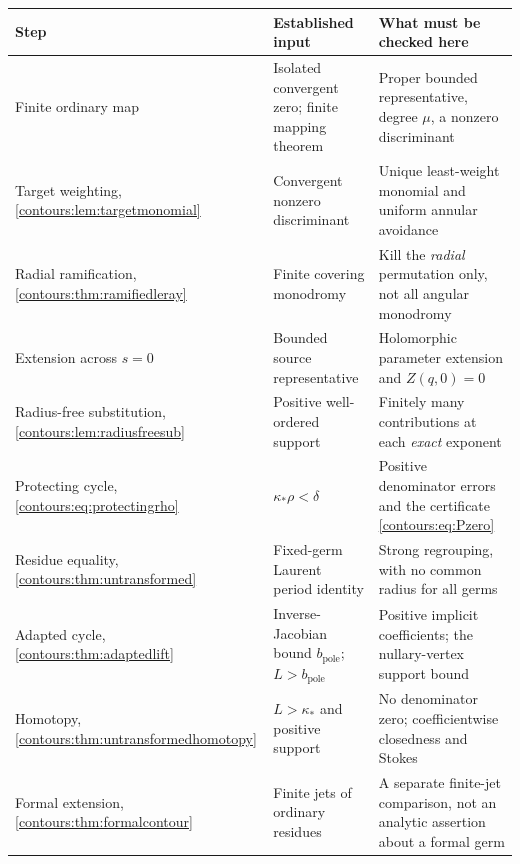 \documentclass[11pt,letterpaper]{article}
\theoremstyle{definition}
\theoremstyle{remark}
\numberwithin{equation}{section}
\begin{document}
\begin{center}\small
\begin{longtable}{@{}L{0.24\textwidth}L{0.34\textwidth}L{0.34\textwidth}@{}}
\toprule
Step & Established input & What must be checked here\\\midrule\endhead
Finite ordinary map & Isolated convergent zero; finite mapping theorem
  & Proper bounded representative, degree $\mu$, a nonzero
    discriminant\\[0.4em]
Target weighting, \cref{contours:lem:targetmonomial} & Convergent nonzero
    discriminant
  & Unique least-weight monomial and uniform annular avoidance\\[0.4em]
Radial ramification, \cref{contours:thm:ramifiedleray} & Finite covering
    monodromy
  & Kill the \emph{radial} permutation only, not all angular monodromy\\[0.4em]
Extension across $s=0$ & Bounded source representative
  & Holomorphic parameter extension and $Z(q,0)=0$\\[0.4em]
Radius-free substitution, \cref{contours:lem:radiusfreesub} & Positive
    well-ordered support
  & Finitely many contributions at each \emph{exact} exponent\\[0.4em]
Protecting cycle, \eqref{contours:eq:protectingrho} & $\kappa_*\rho<\delta$
  & Positive denominator errors and the certificate
    \eqref{contours:eq:Pzero}\\[0.4em]
Residue equality, \cref{contours:thm:untransformed} & Fixed-germ Laurent period
    identity
  & Strong regrouping, with no common radius for all germs\\[0.4em]
Adapted cycle, \cref{contours:thm:adaptedlift} & Inverse-Jacobian bound
    $b_{\mathrm{pole}}$; $L>b_{\mathrm{pole}}$
  & Positive implicit coefficients; the nullary-vertex support bound\\[0.4em]
Homotopy, \cref{contours:thm:untransformedhomotopy} & $L>\kappa_*$ and positive
    support
  & No denominator zero; coefficientwise closedness and Stokes\\[0.4em]
Formal extension, \cref{contours:thm:formalcontour} & Finite jets of ordinary
    residues
  & A separate finite-jet comparison, not an analytic assertion about a formal
    germ\\
\bottomrule
\end{longtable}
\end{center}
\end{document}
